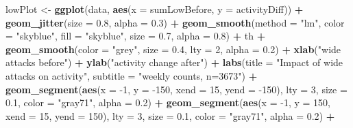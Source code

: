 \documentclass[10pt,]{scrartcl}
\newenvironment{Shaded}{\begin{snugshade}}{\end{snugshade}}
\newcommand{\KeywordTok}[1]{\textcolor[rgb]{0.13,0.29,0.53}{\textbf{#1}}}
\newcommand{\DataTypeTok}[1]{\textcolor[rgb]{0.13,0.29,0.53}{#1}}
\newcommand{\DecValTok}[1]{\textcolor[rgb]{0.00,0.00,0.81}{#1}}
\newcommand{\FloatTok}[1]{\textcolor[rgb]{0.00,0.00,0.81}{#1}}
\newcommand{\StringTok}[1]{\textcolor[rgb]{0.31,0.60,0.02}{#1}}
\newcommand{\OperatorTok}[1]{\textcolor[rgb]{0.81,0.36,0.00}{\textbf{#1}}}
\newcommand{\NormalTok}[1]{#1}
\begin{document}
\footnotesize

\begin{Shaded}
\begin{Highlighting}[]
\NormalTok{lowPlot <-}\StringTok{ }\KeywordTok{ggplot}\NormalTok{(data, }\KeywordTok{aes}\NormalTok{(}\DataTypeTok{x =}\NormalTok{ sumLowBefore, }\DataTypeTok{y =}\NormalTok{ activityDiff)) }\OperatorTok{+}
\StringTok{    }\KeywordTok{geom_jitter}\NormalTok{(}\DataTypeTok{size =} \FloatTok{0.8}\NormalTok{, }\DataTypeTok{alpha =} \FloatTok{0.3}\NormalTok{) }\OperatorTok{+}\StringTok{ }\KeywordTok{geom_smooth}\NormalTok{(}\DataTypeTok{method =} \StringTok{"lm"}\NormalTok{,}
    \DataTypeTok{color =} \StringTok{"skyblue"}\NormalTok{, }\DataTypeTok{fill =} \StringTok{"skyblue"}\NormalTok{, }\DataTypeTok{size =} \FloatTok{0.7}\NormalTok{, }\DataTypeTok{alpha =} \FloatTok{0.8}\NormalTok{) }\OperatorTok{+}
\StringTok{    }\NormalTok{th }\OperatorTok{+}\StringTok{ }\KeywordTok{geom_smooth}\NormalTok{(}\DataTypeTok{color =} \StringTok{"grey"}\NormalTok{, }\DataTypeTok{size =} \FloatTok{0.4}\NormalTok{, }\DataTypeTok{lty =} \DecValTok{2}\NormalTok{, }\DataTypeTok{alpha =} \FloatTok{0.2}\NormalTok{) }\OperatorTok{+}
\StringTok{    }\KeywordTok{xlab}\NormalTok{(}\StringTok{"wide attacks before"}\NormalTok{) }\OperatorTok{+}\StringTok{ }\KeywordTok{ylab}\NormalTok{(}\StringTok{"activity change after"}\NormalTok{) }\OperatorTok{+}
\StringTok{    }\KeywordTok{labs}\NormalTok{(}\DataTypeTok{title =} \StringTok{"Impact of wide attacks on activity"}\NormalTok{, }\DataTypeTok{subtitle =} \StringTok{"weekly counts, n=3673"}\NormalTok{) }\OperatorTok{+}
\StringTok{    }\KeywordTok{geom_segment}\NormalTok{(}\KeywordTok{aes}\NormalTok{(}\DataTypeTok{x =} \DecValTok{-1}\NormalTok{, }\DataTypeTok{y =} \DecValTok{-150}\NormalTok{, }\DataTypeTok{xend =} \DecValTok{15}\NormalTok{, }\DataTypeTok{yend =} \DecValTok{-150}\NormalTok{),}
        \DataTypeTok{lty =} \DecValTok{3}\NormalTok{, }\DataTypeTok{size =} \FloatTok{0.1}\NormalTok{, }\DataTypeTok{color =} \StringTok{"gray71"}\NormalTok{, }\DataTypeTok{alpha =} \FloatTok{0.2}\NormalTok{) }\OperatorTok{+}
\StringTok{    }\KeywordTok{geom_segment}\NormalTok{(}\KeywordTok{aes}\NormalTok{(}\DataTypeTok{x =} \DecValTok{-1}\NormalTok{, }\DataTypeTok{y =} \DecValTok{150}\NormalTok{, }\DataTypeTok{xend =} \DecValTok{15}\NormalTok{, }\DataTypeTok{yend =} \DecValTok{150}\NormalTok{),}
        \DataTypeTok{lty =} \DecValTok{3}\NormalTok{, }\DataTypeTok{size =} \FloatTok{0.1}\NormalTok{, }\DataTypeTok{color =} \StringTok{"gray71"}\NormalTok{, }\DataTypeTok{alpha =} \FloatTok{0.2}\NormalTok{) }\OperatorTok{+}

\end{Highlighting}
\end{Shaded}
\end{document}
